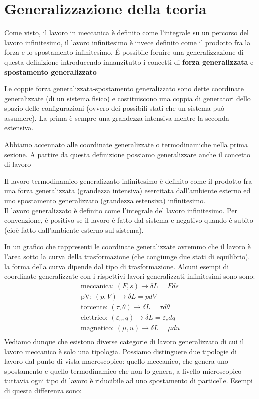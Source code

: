 \documentclass[
10pt, %
a4paper, %
oneside, %
headinclude,footinclude, %
BCOR5mm, %
]{scrartcl}
\begin{document}
\section{Generalizzazione della teoria}
Come visto, il lavoro in meccanica è definito come l'integrale su un percorso del lavoro infinitesimo, il lavoro infinitesimo è invece definito come il prodotto fra la forza e lo spostamento infinitesimo. \'{E} possibile fornire una generalizzazione di questa definizione introducendo innanzitutto i concetti di \textbf{forza generalizzata} e \textbf{spostamento generalizzato}
\begin{definition}
	Le coppie forza generalizzata-spostamento generalizzato sono dette coordinate generalizzate (di un sistema fisico) e costituiscono una coppia di generatori dello spazio delle configurazioni (ovvero dei possibili stati che un sistema può assumere). La prima è sempre una grandezza intensiva mentre la seconda estensiva.
\end{definition}
Abbiamo accennato alle coordinate generalizzate o termodinamiche nella prima sezione. A partire da questa definizione possiamo generalizzare anche il concetto di lavoro
\begin{definition}
	Il lavoro termodinamico generalizzato infinitesimo è definito come il prodotto fra una forza generalizzata (grandezza intensiva) esercitata dall'ambiente esterno ed uno spostamento generalizzato (grandezza estensiva) infinitesimo.\\
	Il lavoro generalizzato è definito come l'integrale del lavoro infinitesimo. 
	Per convenzione, è positivo se il lavoro è fatto dal sistema e negativo quando è subito (cioè fatto dall'ambiente esterno sul sistema). 
\end{definition}
In un grafico che rappresenti le coordinate generalizzate avremmo che il lavoro è l'area sotto la curva della trasformazione (che congiunge due stati di equilibrio). la forma della curva dipende dal tipo di trasformazione.  
Alcuni esempi di coordinate generalizzate con i rispettivi lavori generalizzati infinitesimi sono sono:
\begin{align*} 
	\text{meccanica: }(F, s)\rightarrow\delta L = F ds\\ 
	\text{pV: }(p, V)\rightarrow\delta L=p dV\\
	\text{torcente: }(\tau, \theta)\rightarrow\delta L=\tau d\theta\\
	\text{elettrico: }(\varepsilon_e, q)\rightarrow\delta L=\varepsilon_edq\\
	\text{magnetico: }(\mu, u)\rightarrow\delta L=\mu du\\
\end{align*} 
Vediamo dunque che esistono diverse categorie di lavoro generalizzato di cui il lavoro meccanico è solo una tipologia. Possiamo distinguere due tipologie di lavoro dal punto di vista macroscopico: quello meccanico, che genera uno spostamento e quello termodinamico che non lo genera, a livello microscopico tuttavia ogni tipo di lavoro è riducibile ad uno spostamento di particelle. Esempi di questa differenza sono:
\end{document}
